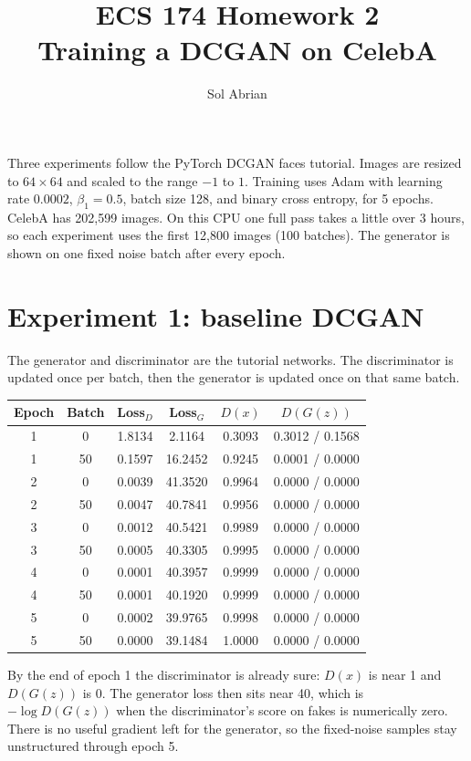 \documentclass[11pt]{article}
\title{ECS 174 Homework 2\\Training a DCGAN on CelebA}
\author{Sol Abrian}
\date{}
\begin{document}
\maketitle

Three experiments follow the PyTorch DCGAN faces tutorial. Images are resized to \(64\times 64\) and scaled to the range \(-1\) to \(1\). Training uses Adam with learning rate \(0.0002\), \(\beta_1=0.5\), batch size 128, and binary cross entropy, for 5 epochs. CelebA has 202,599 images. On this CPU one full pass takes a little over 3 hours, so each experiment uses the first 12,800 images (100 batches). The generator is shown on one fixed noise batch after every epoch.

\section{Experiment 1: baseline DCGAN}

The generator and discriminator are the tutorial networks. The discriminator is updated once per batch, then the generator is updated once on that same batch.

\begin{center}
\small
\begin{tabular}{@{}cccccc@{}}
\toprule
Epoch & Batch & Loss\(_D\) & Loss\(_G\) & \(D(x)\) & \(D(G(z))\) \\
\midrule
1 & 0 & 1.8134 & 2.1164 & 0.3093 & 0.3012 / 0.1568 \\
1 & 50 & 0.1597 & 16.2452 & 0.9245 & 0.0001 / 0.0000 \\
2 & 0 & 0.0039 & 41.3520 & 0.9964 & 0.0000 / 0.0000 \\
2 & 50 & 0.0047 & 40.7841 & 0.9956 & 0.0000 / 0.0000 \\
3 & 0 & 0.0012 & 40.5421 & 0.9989 & 0.0000 / 0.0000 \\
3 & 50 & 0.0005 & 40.3305 & 0.9995 & 0.0000 / 0.0000 \\
4 & 0 & 0.0001 & 40.3957 & 0.9999 & 0.0000 / 0.0000 \\
4 & 50 & 0.0001 & 40.1920 & 0.9999 & 0.0000 / 0.0000 \\
5 & 0 & 0.0002 & 39.9765 & 0.9998 & 0.0000 / 0.0000 \\
5 & 50 & 0.0000 & 39.1484 & 1.0000 & 0.0000 / 0.0000 \\
\bottomrule
\end{tabular}
\end{center}

By the end of epoch 1 the discriminator is already sure: \(D(x)\) is near 1 and \(D(G(z))\) is 0. The generator loss then sits near 40, which is \(-\log D(G(z))\) when the discriminator's score on fakes is numerically zero. There is no useful gradient left for the generator, so the fixed-noise samples stay unstructured through epoch 5.
\end{document}

